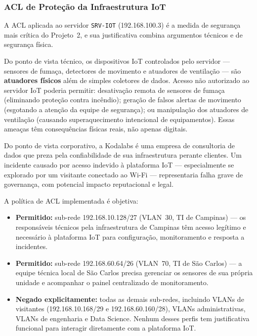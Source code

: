\documentclass[12pt,a4paper]{article}
\begin{document}
\subsubsection{ACL de Proteção da Infraestrutura IoT}

A ACL aplicada ao servidor \texttt{SRV-IOT} (192.168.100.3) é a medida de
segurança mais crítica do Projeto~2, e sua justificativa combina argumentos
técnicos e de segurança física.

Do ponto de vista técnico, os dispositivos IoT controlados pelo servidor — sensores
de fumaça, detectores de movimento e atuadores de ventilação — são
\textbf{atuadores físicos} além de simples coletores de dados. Acesso não
autorizado ao servidor IoT poderia permitir: desativação remota de sensores de
fumaça (eliminando proteção contra incêndio); geração de falsos alertas de movimento
(esgotando a atenção da equipe de segurança); ou manipulação dos atuadores de
ventilação (causando superaquecimento intencional de equipamentos). Essas ameaças
têm consequências físicas reais, não apenas digitais.

Do ponto de vista corporativo, a Kodalabs é uma empresa de consultoria de dados
que preza pela confiabilidade de sua infraestrutura perante clientes. Um incidente
causado por acesso indevido à plataforma IoT — especialmente se explorado por um
visitante conectado ao Wi-Fi — representaria falha grave de governança, com
potencial impacto reputacional e legal.

A política de ACL implementada é objetiva:

\begin{itemize}
    \item \textbf{Permitido:} sub-rede 192.168.10.128/27 (VLAN~30, TI de Campinas)
    — os responsáveis técnicos pela infraestrutura de Campinas têm acesso legítimo
    e necessário à plataforma IoT para configuração, monitoramento e resposta a
    incidentes.
    \item \textbf{Permitido:} sub-rede 192.168.60.64/26 (VLAN~70, TI de São Carlos)
    — a equipe técnica local de São Carlos precisa gerenciar os sensores de sua
    própria unidade e acompanhar o painel centralizado de monitoramento.
    \item \textbf{Negado explicitamente:} todas as demais sub-redes, incluindo
    VLANs de visitantes (192.168.10.168/29 e 192.168.60.160/28), VLANs
    administrativas, VLANs de engenharia e Data Science. Nenhum desses perfis
    tem justificativa funcional para interagir diretamente com a plataforma IoT.
\end{itemize}
\end{document}
